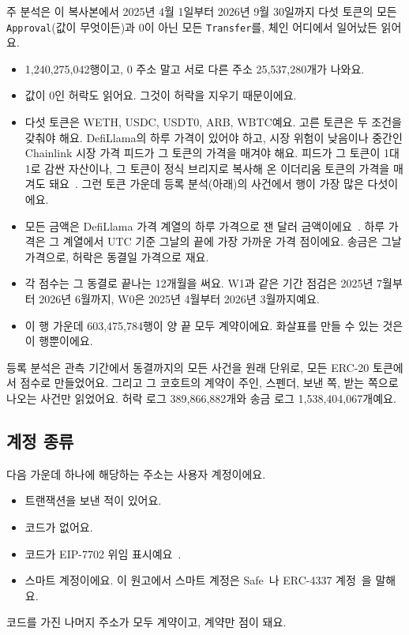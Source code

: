 주 분석은 이 복사본에서 2025년 4월 1일부터 2026년 9월 30일까지 다섯 토큰의 모든 \texttt{Approval}(값이 무엇이든)과 0이 아닌 모든 \texttt{Transfer}를, 체인 어디에서 일어났든 읽어요.
\begin{itemize}
\item 1,240,275,042행이고, 0 주소 말고 서로 다른 주소 25,537,280개가 나와요.
\item 값이 0인 허락도 읽어요. 그것이 허락을 지우기 때문이에요.
\item 다섯 토큰은 WETH, USDC, USDT0, ARB, WBTC예요. 고른 토큰은 두 조건을 갖춰야 해요. DefiLlama의 하루 가격이 있어야 하고, 시장 위험이 낮음이나 중간인 Chainlink 시장 가격 피드가 그 토큰의 가격을 매겨야 해요. 피드가 그 토큰이 1대 1로 감싼 자산이나, 그 토큰이 정식 브리지로 복사해 온 이더리움 토큰의 가격을 매겨도 돼요~\cite{chainlinknddatafeeds}. 그런 토큰 가운데 등록 분석(아래)의 사건에서 행이 가장 많은 다섯이에요.
\item 모든 금액은 DefiLlama 가격 계열의 하루 가격으로 잰 달러 금액이에요~\cite{defillamanddocs}. 하루 가격은 그 계열에서 UTC 기준 그날의 끝에 가장 가까운 가격 점이에요. 송금은 그날 가격으로, 허락은 동결일 가격으로 재요.
\item 각 점수는 그 동결로 끝나는 12개월을 써요. W1과 같은 기간 점검은 2025년 7월부터 2026년 6월까지, W0은 2025년 4월부터 2026년 3월까지예요.
\item 이 행 가운데 603,475,784행이 양 끝 모두 계약이에요. 화살표를 만들 수 있는 것은 이 행뿐이에요.
\end{itemize}

등록 분석은 관측 기간에서 동결까지의 모든 사건을 원래 단위로, 모든 ERC-20 토큰에서 점수로 만들었어요. 그리고 그 코호트의 계약이 주인, 스펜더, 보낸 쪽, 받는 쪽으로 나오는 사건만 읽었어요. 허락 로그 389,866,882개와 송금 로그 1,538,404,067개예요.

\subsection{계정 종류}
\label{sec:types}

다음 가운데 하나에 해당하는 주소는 사용자 계정이에요.
\begin{itemize}
\item 트랜잭션을 보낸 적이 있어요.
\item 코드가 없어요.
\item 코드가 EIP-7702 위임 표시예요~\cite{buterin2024eip7702}.
\item 스마트 계정이에요. 이 원고에서 스마트 계정은 Safe~\cite{safenddocs}나 ERC-4337 계정~\cite{buterin2021erc4337}을 말해요.
\end{itemize}
코드를 가진 나머지 주소가 모두 계약이고, 계약만 점이 돼요.

